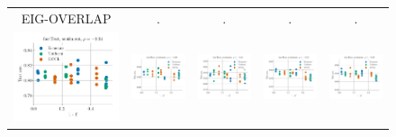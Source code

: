 \begin{figure}
	\centering
	\begin{tabular}{@{\hskip -0.0in}c@{\hskip -0.0in}c@{\hskip -0.0in}c@{\hskip -0.0in}c@{\hskip -0.0in}c@{\hskip -0.0in}}
		EIG-OVERLAP & . & . & . & .\\
		\includegraphics[width=.2\linewidth]{figures/fasttext1m_sentiment_mr_test-acc_vs_subspace-eig-overlap_linx.pdf} &
		\includegraphics[width=.2\linewidth]{figures/fasttext1m_sentiment_subj_test-acc_vs_subspace-eig-overlap_linx.pdf} &
		\includegraphics[width=.2\linewidth]{figures/fasttext1m_sentiment_cr_test-acc_vs_subspace-eig-overlap_linx.pdf} &
		\includegraphics[width=.2\linewidth]{figures/fasttext1m_sentiment_sst_test-acc_vs_subspace-eig-overlap_linx.pdf} &
		\includegraphics[width=.2\linewidth]{figures/fasttext1m_sentiment_mpqa_test-acc_vs_subspace-eig-overlap_linx.pdf} \\
		

\end{tabular}
\end{figure}
